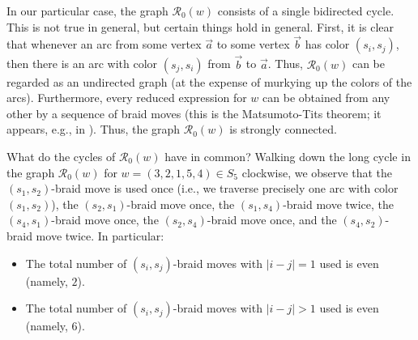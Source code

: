 \documentclass[numbers=enddot,12pt,final,onecolumn,notitlepage,abstracton]{scrartcl}%
\theoremstyle{definition}
\begin{document}
In our particular case, the graph $\mathcal{R}_{0}\left(  w\right)  $ consists
of a single bidirected cycle. This is not true in general, but certain things
hold in general. First, it is clear that whenever an arc from some vertex
$\overrightarrow{a}$ to some vertex $\overrightarrow{b}$ has color $\left(
s_{i},s_{j}\right)  $, then there is an arc with color $\left(  s_{j}%
,s_{i}\right)  $ from $\overrightarrow{b}$ to $\overrightarrow{a}$. Thus,
$\mathcal{R}_{0}\left(  w\right)  $ can be regarded as an undirected graph (at
the expense of murkying up the colors of the arcs). Furthermore, every reduced
expression for $w$ can be obtained from any other by a sequence of braid moves
(this is the Matsumoto-Tits theorem; it appears, e.g., in \cite[Theorem
1.9]{Lusztig-Hecke}). Thus, the graph $\mathcal{R}_{0}\left(  w\right)  $ is
strongly connected.

What do the cycles of $\mathcal{R}_{0}\left(  w\right)  $ have in common?
Walking down the long cycle in the graph $\mathcal{R}_{0}\left(  w\right)  $
for $w=\left(  3,2,1,5,4\right)  \in S_{5}$ clockwise, we observe that the
$\left(  s_{1},s_{2}\right)  $-braid move is used once (i.e., we traverse
precisely one arc with color $\left(  s_{1},s_{2}\right)  $), the $\left(
s_{2},s_{1}\right)  $-braid move once, the $\left(  s_{1},s_{4}\right)
$-braid move twice, the $\left(  s_{4},s_{1}\right)  $-braid move once, the
$\left(  s_{2},s_{4}\right)  $-braid move once, and the $\left(  s_{4}%
,s_{2}\right)  $-braid move twice. In particular:

\begin{itemize}
\item The total number of $\left(  s_{i},s_{j}\right)  $-braid moves with
$\left\vert i-j\right\vert =1$ used is even (namely, $2$).

\item The total number of $\left(  s_{i},s_{j}\right)  $-braid moves with
$\left\vert i-j\right\vert >1$ used is even (namely, $6$).
\end{itemize}
\end{document}
